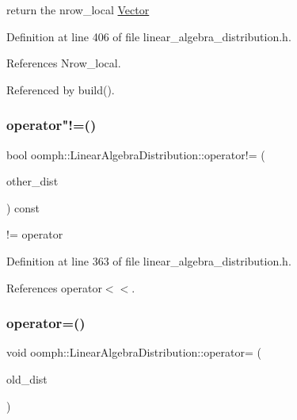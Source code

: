 return the nrow\+\_\+local \hyperlink{classoomph_1_1Vector}{Vector} 



Definition at line 406 of file linear\+\_\+algebra\+\_\+distribution.\+h.



References Nrow\+\_\+local.



Referenced by build().

\mbox{\label{classoomph_1_1LinearAlgebraDistribution_a40765b8fee6c000dbe5b94c38d76466e}} 
\subsubsection{\texorpdfstring{operator"!=()}{operator!=()}}
{\footnotesize\ttfamily bool oomph\+::\+Linear\+Algebra\+Distribution\+::operator!= (\begin{DoxyParamCaption}\item[{const \hyperlink{classoomph_1_1LinearAlgebraDistribution}{Linear\+Algebra\+Distribution} \&}]{other\+\_\+dist }\end{DoxyParamCaption}) const\hspace{0.3cm}{\ttfamily [inline]}}



!= operator 



Definition at line 363 of file linear\+\_\+algebra\+\_\+distribution.\+h.



References operator$<$$<$.

\mbox{\label{classoomph_1_1LinearAlgebraDistribution_a0339adfd0ac99e1a443b7313063beaa9}} 
\subsubsection{\texorpdfstring{operator=()}{operator=()}}
{\footnotesize\ttfamily void oomph\+::\+Linear\+Algebra\+Distribution\+::operator= (\begin{DoxyParamCaption}\item[{const \hyperlink{classoomph_1_1LinearAlgebraDistribution}{Linear\+Algebra\+Distribution} \&}]{old\+\_\+dist }\end{DoxyParamCaption})\hspace{0.3cm}{\ttfamily [inline]}}



